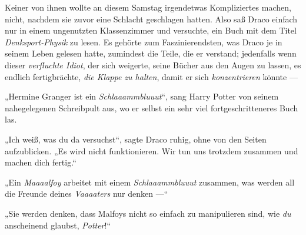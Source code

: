 
Keiner von ihnen wollte an diesem Samstag irgendetwas Kompliziertes machen, nicht, nachdem sie zuvor eine Schlacht geschlagen hatten. Also saß Draco einfach nur in einem ungenutzten Klassenzimmer und versuchte, ein Buch mit dem Titel \emph{Denksport-Physik} zu lesen.%
Es gehörte zum Faszinierendsten, was Draco je in seinem Leben gelesen hatte, zumindest die Teile, die er verstand; jedenfalls wenn dieser \emph{verfluchte Idiot}, der sich weigerte, seine Bücher aus den Augen zu lassen, es endlich fertigbrächte, \emph{die Klappe zu halten}, damit er sich \emph{konzentrieren} könnte —

„Hermine Granger ist ein \emph{Schlaaammbluuut}“, sang Harry Potter von seinem nahegelegenen Schreibpult aus, wo er selbst ein sehr viel fortgeschritteneres Buch las.

„Ich weiß, was du da versuchst“, sagte Draco ruhig, ohne von den Seiten aufzublicken.
„Es wird nicht funktionieren. Wir tun uns trotzdem zusammen und machen dich fertig.“

„Ein \emph{Maaaalfoy} arbeitet mit einem \emph{Schlaaammbluuut} zusammen, was werden all die Freunde deines \emph{Vaaaaters} nur denken —“

„Sie werden denken, dass Malfoys nicht so einfach zu manipulieren sind, wie \emph{du} anscheinend glaubst, \emph{Potter}!“

